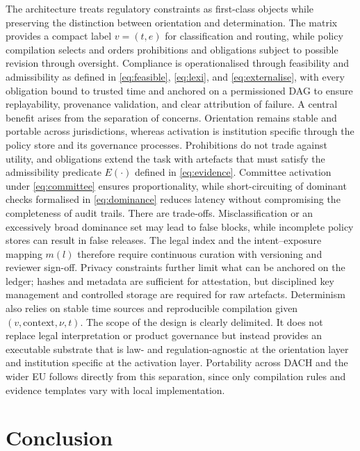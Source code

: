 \documentclass[oneside,10pt]{swissi}
\begin{document}
The architecture treats regulatory constraints as first-class objects while preserving the distinction between orientation and determination. The matrix provides a compact label \(v=(t,e)\) for classification and routing, while policy compilation selects and orders prohibitions and obligations subject to possible revision through oversight. Compliance is operationalised through feasibility and admissibility as defined in \eqref{eq:feasible}, \eqref{eq:lexi}, and \eqref{eq:externalise}, with every obligation bound to trusted time and anchored on a permissioned DAG to ensure replayability, provenance validation, and clear attribution of failure. A central benefit arises from the separation of concerns. Orientation remains stable and portable across jurisdictions, whereas activation is institution specific through the policy store and its governance processes. Prohibitions do not trade against utility, and obligations extend the task with artefacts that must satisfy the admissibility predicate \(E(\cdot)\) defined in \eqref{eq:evidence}. Committee activation under \eqref{eq:committee} ensures proportionality, while short-circuiting of dominant checks formalised in \eqref{eq:dominance} reduces latency without compromising the completeness of audit trails. There are trade-offs. Misclassification or an excessively broad dominance set may lead to false blocks, while incomplete policy stores can result in false releases. The legal index and the intent–exposure mapping \(m(l)\) therefore require continuous curation with versioning and reviewer sign-off. Privacy constraints further limit what can be anchored on the ledger; hashes and metadata are sufficient for attestation, but disciplined key management and controlled storage are required for raw artefacts. Determinism also relies on stable time sources and reproducible compilation given \((v,\text{context},\nu,t)\). The scope of the design is clearly delimited. It does not replace legal interpretation or product governance but instead provides an executable substrate that is law- and regulation-agnostic at the orientation layer and institution specific at the activation layer. Portability across DACH and the wider EU follows directly from this separation, since only compilation rules and evidence templates vary with local implementation.\\

\section{Conclusion}
\end{document}
